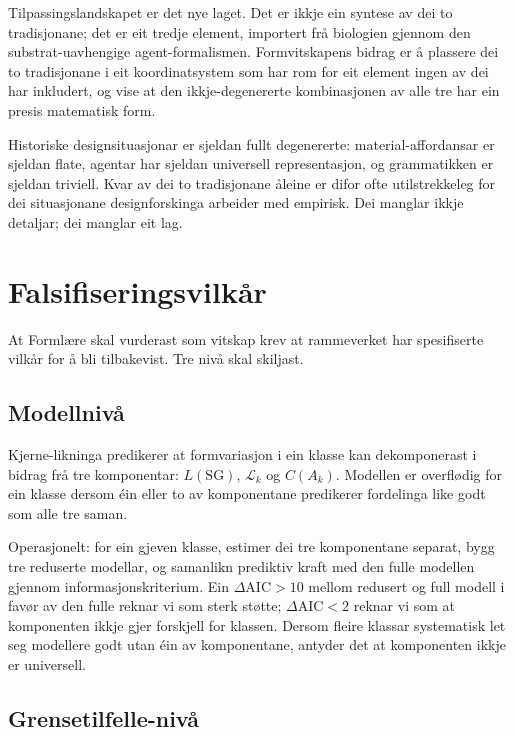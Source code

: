 \documentclass[11pt,a4paper]{article}
\begin{document}
Tilpassingslandskapet er det nye laget. Det er ikkje ein syntese av dei to tradisjonane; det er eit tredje element, importert frå biologien gjennom den substrat-uavhengige agent-formalismen. Formvitskapens bidrag er å plassere dei to tradisjonane i eit koordinatsystem som har rom for eit element ingen av dei har inkludert, og vise at den ikkje-degenererte kombinasjonen av alle tre har ein presis matematisk form.

Historiske designsituasjonar er sjeldan fullt degenererte: material-affordansar er sjeldan flate, agentar har sjeldan universell representasjon, og grammatikken er sjeldan triviell. Kvar av dei to tradisjonane åleine er difor ofte utilstrekkeleg for dei situasjonane designforskinga arbeider med empirisk. Dei manglar ikkje detaljar; dei manglar eit lag.

\section{Falsifiseringsvilkår}

At Formlære skal vurderast som vitskap krev at rammeverket har spesifiserte vilkår for å bli tilbakevist. Tre nivå skal skiljast.

\subsection{Modellnivå}

Kjerne-likninga predikerer at formvariasjon i ein klasse kan dekomponerast i bidrag frå tre komponentar: $L(\mathrm{SG})$, $\mathcal{L}_k$ og $C(A_k)$. Modellen er overflødig for ein klasse dersom éin eller to av komponentane predikerer fordelinga like godt som alle tre saman.

Operasjonelt: for ein gjeven klasse, estimer dei tre komponentane separat, bygg tre reduserte modellar, og samanlikn prediktiv kraft med den fulle modellen gjennom informasjonskriterium. Ein $\Delta\mathrm{AIC} > 10$ mellom redusert og full modell i favør av den fulle reknar vi som sterk støtte; $\Delta\mathrm{AIC} < 2$ reknar vi som at komponenten ikkje gjer forskjell for klassen. Dersom fleire klassar systematisk let seg modellere godt utan éin av komponentane, antyder det at komponenten ikkje er universell.

\subsection{Grensetilfelle-nivå}
\end{document}
